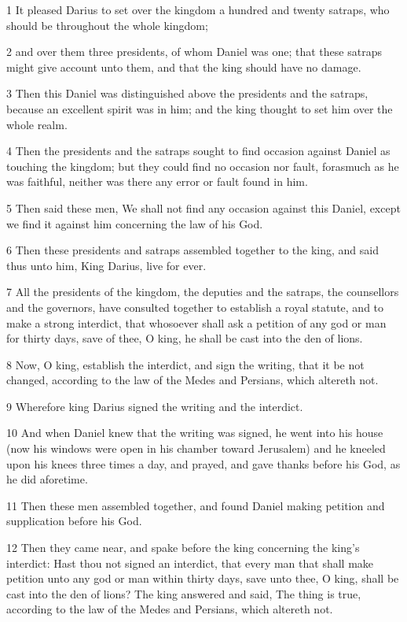 \par 1 It pleased Darius to set over the kingdom a hundred and twenty satraps, who should be throughout the whole kingdom;
\par 2 and over them three presidents, of whom Daniel was one; that these satraps might give account unto them, and that the king should have no damage.
\par 3 Then this Daniel was distinguished above the presidents and the satraps, because an excellent spirit was in him; and the king thought to set him over the whole realm.
\par 4 Then the presidents and the satraps sought to find occasion against Daniel as touching the kingdom; but they could find no occasion nor fault, forasmuch as he was faithful, neither was there any error or fault found in him.
\par 5 Then said these men, We shall not find any occasion against this Daniel, except we find it against him concerning the law of his God.
\par 6 Then these presidents and satraps assembled together to the king, and said thus unto him, King Darius, live for ever.
\par 7 All the presidents of the kingdom, the deputies and the satraps, the counsellors and the governors, have consulted together to establish a royal statute, and to make a strong interdict, that whosoever shall ask a petition of any god or man for thirty days, save of thee, O king, he shall be cast into the den of lions.
\par 8 Now, O king, establish the interdict, and sign the writing, that it be not changed, according to the law of the Medes and Persians, which altereth not.
\par 9 Wherefore king Darius signed the writing and the interdict.
\par 10 And when Daniel knew that the writing was signed, he went into his house (now his windows were open in his chamber toward Jerusalem) and he kneeled upon his knees three times a day, and prayed, and gave thanks before his God, as he did aforetime.
\par 11 Then these men assembled together, and found Daniel making petition and supplication before his God.
\par 12 Then they came near, and spake before the king concerning the king's interdict: Hast thou not signed an interdict, that every man that shall make petition unto any god or man within thirty days, save unto thee, O king, shall be cast into the den of lions? The king answered and said, The thing is true, according to the law of the Medes and Persians, which altereth not.
